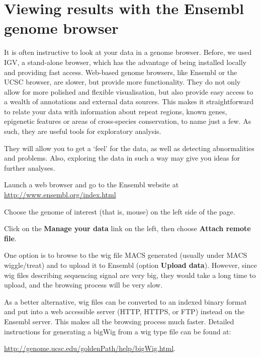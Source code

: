 \section{Viewing results with the Ensembl genome browser}

\begin{information}
It is often instructive to look at your data in a genome browser. Before, we
used IGV, a stand-alone browser, which has the advantage of being installed
locally and providing fast access. Web-based genome browsers, like Ensembl or
the UCSC browser, are slower, but provide more functionality. They do not only
allow for more polished and flexible visualisation, but also provide easy access
to a wealth of annotations and external data sources. This makes it
straightforward to relate your data with information about repeat regions, known
genes, epigenetic features or areas of cross-species conservation, to name just
a few. As such, they are useful tools for exploratory analysis.

They will allow you to get a `feel' for the data, as well as detecting
abnormalities and problems. Also, exploring the data in such a way may give you
ideas for further analyses.
\end{information}

\begin{steps}
Launch a web browser and go to the Ensembl website at
\url{http://www.ensembl.org/index.html}

Choose the genome of interest (that is, mouse) on the left side of the page.

Click on the \textbf{Manage your data} link on the left, then choose
\textbf{Attach remote file}.

\end{steps}

\begin{note}
One option is to browse to the wig file MACS generated (usually under MACS
wiggle/treat) and to upload it to Ensembl (option \textbf{Upload data}).
However, since wig files describing sequencing signal are very big, they would
take a long time to upload, and the browsing process will be very slow.

As a better alternative, wig files can be converted to an indexed binary format
and put into a web accessible server (HTTP, HTTPS, or FTP) instead on the
Ensembl server. This makes all the browsing process much faster. Detailed
instructions for generating a bigWig from a wig type file can be found at:

\url{http://genome.ucsc.edu/goldenPath/help/bigWig.html}.

\end{note}

